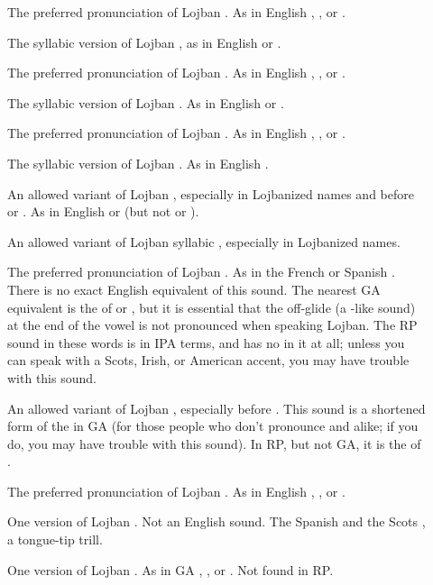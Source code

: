 \begin{description}
\item[] The preferred pronunciation of Lojban . As in English , , or .
\item[] The syllabic version of Lojban , as in English  or .
\item[] The preferred pronunciation of Lojban . As in English , , or .
\item[] The syllabic version of Lojban . As in English  or .
\item[] The preferred pronunciation of Lojban . As in English , , or .
\item[] The syllabic version of Lojban . As in English .
\item[] An allowed variant of Lojban , especially in Lojbanized names and before  or . As in English  or  (but not  or ).
\item[] An allowed variant of Lojban syllabic , especially in Lojbanized names.
\item[] The preferred pronunciation of Lojban . As in the French  or Spanish . There is no exact English equivalent of this sound. The nearest GA equivalent is the  of  or , but it is essential that the off-glide (a -like sound) at the end of the vowel is not pronounced when speaking Lojban. The RP sound in these words is  in IPA terms, and has no  in it at all; unless you can speak with a Scots, Irish, or American accent, you may have trouble with this sound.
\item[] An allowed variant of Lojban , especially before . This sound is a shortened form of the  in GA  (for those people who don't pronounce  and  alike; if you do, you may have trouble with this sound). In RP, but not GA, it is the  of .
\item[] The preferred pronunciation of Lojban . As in English , , or .
\item[] One version of Lojban . Not an English sound. The Spanish  and the Scots , a tongue-tip trill.
\item[] One version of Lojban . As in GA , , or . Not found in RP.

\end{description}

